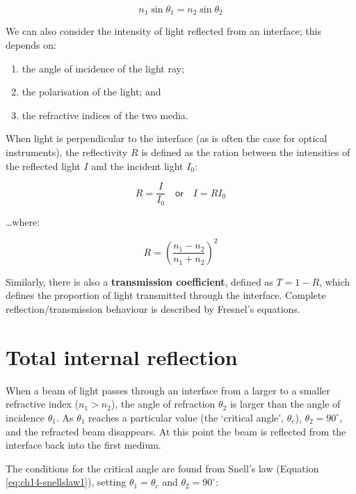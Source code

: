 \documentclass[
]{book}
\providecommand{\tightlist}{%
  \setlength{\itemsep}{0pt}\setlength{\parskip}{0pt}}
\begin{document}
\begin{equation}
n_1 \sin \theta_1 = n_2 \sin \theta_2
\label{eq:ch14-snellslaw1}
\end{equation}

We can also consider the intensity of light reflected from an interface; this depends on:

\begin{enumerate}
\def\labelenumi{\arabic{enumi}.}
\tightlist
\item
  the angle of incidence of the light ray;
\item
  the polarisation of the light; and
\item
  the refractive indices of the two media.
\end{enumerate}

When light is perpendicular to the interface (as is often the case for optical instruments), the reflectivity \(R\) is defined as the ration between the intensities of the reflected light \(I\) and the incident light \(I_0\):

\begin{equation}
R = \frac{I}{I_0} \quad \textsf{or} \quad I = R I_0
\end{equation}

\ldots where:

\begin{equation}
R = \left( \frac{n_1 - n_2}{n_1 + n_2} \right)^2
\end{equation}

Similarly, there is also a \textbf{transmission coefficient}, defined as \(T = 1-R\), which defines the proportion of light transmitted through the interface. Complete reflection/transmission behaviour is described by Fresnel's equations.

\hypertarget{sec:ch14-internalreflection}{%
\section{Total internal reflection}\label{sec:ch14-internalreflection}}

When a beam of light passes through an interface from a larger to a smaller refractive index (\(n_1 > n_2\)), the angle of refraction \(\theta_2\) is larger than the angle of incidence \(\theta_1\). As \(\theta_1\) reaches a particular value (the `critical angle', \(\theta_c\)), \(\theta_2 = 90^\circ\), and the refracted beam disappears. At this point the beam is reflected from the interface back into the first medium.

The conditions for the critical angle are found from Snell's law (Equation \eqref{eq:ch14-snellslaw1}), setting \(\theta_1 = \theta_c\) and \(\theta_2 = 90^\circ\):
\end{document}

